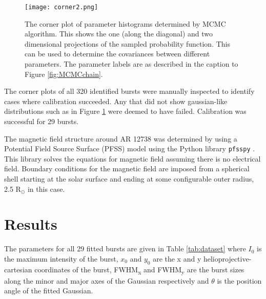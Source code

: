 \begin{figure}
\centering
\texttt{[image: corner2.png]}
\caption[A corner plot of parameter histograms determined by MCMC algorithm.]{The corner plot of parameter histograms determined by MCMC algorithm. This shows the one (along the diagonal) and two dimensional projections of the sampled probability function. This can be used to determine the covariances between different parameters. The parameter labels are as described in the caption to Figure \ref{fig:MCMCchain}.}
\label{fig:MCMCcorner}
\end{figure}

The corner plots of all 320 identified bursts were manually inspected to identify cases where calibration succeeded. Any that did not show gaussian-like distributions such as in Figure \ref{fig:MCMCcorner} were deemed to have failed. Calibration was successful for 29 bursts.  

The magnetic field structure around AR 12738 was determined by using a Potential Field Source Surface (PFSS) model using the Python library \texttt{pfsspy} \citep{Stansby2020}. This library solves the equations for magnetic field assuming there is no electrical field. Boundary conditions for the magnetic field are imposed from a spherical shell starting at the solar surface and ending at some configurable outer radius, 2.5 R$_\odot$ in this case.


\section{Results}
\label{sec:obsvtheory_results}
The parameters for all 29 fitted bursts are given in Table \ref{tab:dataset} where $I_0$ is the maximum intensity of the burst, $x_0$ and $y_0$ are the x and y  helioprojective-cartesian coordinates of the burst, FWHM\textsubscript{x} and FWHM\textsubscript{y} are the burst sizes along the minor and major axes of the Gaussian respectively and $\theta$ is the position angle of the fitted Gaussian. %

